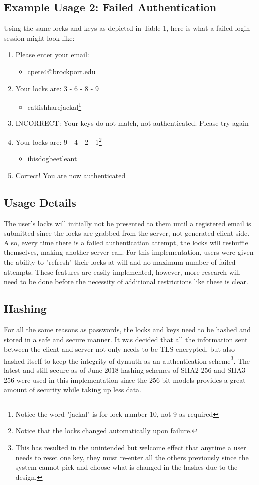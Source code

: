 \documentclass[conference]{IEEEtran}
\begin{document}
\subsection{Example Usage 2: Failed Authentication}
	Using the same locks and keys as depicted in Table 1, here is what a failed login session might look like:
	\begin{enumerate}
		\item Please enter your email:
		\begin{itemize}
			\item cpete4@brockport.edu
		\end{itemize}
		\item Your locks are: 3 - 6 - 8 - 9
		\begin{itemize}
			\item catfishharejackal\footnote{Notice the word "jackal" is for lock number 10, not 9 as required}
		\end{itemize}
		\item INCORRECT: Your keys do not match, not authenticated. Please try again
		\item Your locks are: 9 - 4 - 2 - 1\footnote{Notice that the locks changed automatically upon failure.}
		\begin{itemize}
			\item ibisdogbeetleant
		\end{itemize}
		\item Correct! You are now authenticated
	\end{enumerate}
\subsection{Usage Details}
	The user's locks will initially not be presented to them until a registered email is submitted since the locks are grabbed from the server, not generated client side. Also, every time there is a failed authentication attempt, the locks will reshuffle themselves, making another server call. For this implementation, users were given the ability to "refresh" their locks at will and no maximum number of failed attempts. These features are easily implemented, however, more research will need to be done before the necessity of additional restrictions like these is clear.
\subsection{Hashing}
	For all the same reasons as passwords\cite{Citation Needed}, the locks and keys need to be hashed and stored in a safe and secure manner. It was decided that all the information sent between the client and server not only needs to be TLS encrypted, but also hashed itself to keep the integrity of dynauth as an authentication scheme\footnote{This has resulted in the unintended but welcome effect that anytime a user needs to reset one key, they must re-enter all the others previously since the system cannot pick and choose what is changed in the hashes due to the design.}. The latest and still secure as of June 2018 hashing schemes of SHA2-256 and SHA3-256 were used in this implementation since the 256 bit models provides a great amount of security while taking up less data.
\end{document}
